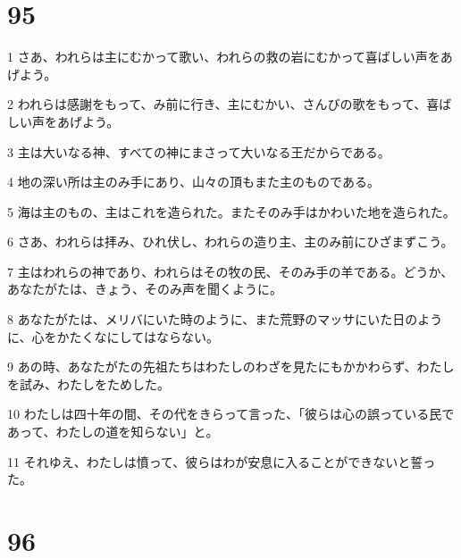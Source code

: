 \chapter{95}

\par 1 さあ、われらは主にむかって歌い、われらの救の岩にむかって喜ばしい声をあげよう。
\par 2 われらは感謝をもって、み前に行き、主にむかい、さんびの歌をもって、喜ばしい声をあげよう。
\par 3 主は大いなる神、すべての神にまさって大いなる王だからである。
\par 4 地の深い所は主のみ手にあり、山々の頂もまた主のものである。
\par 5 海は主のもの、主はこれを造られた。またそのみ手はかわいた地を造られた。
\par 6 さあ、われらは拝み、ひれ伏し、われらの造り主、主のみ前にひざまずこう。
\par 7 主はわれらの神であり、われらはその牧の民、そのみ手の羊である。どうか、あなたがたは、きょう、そのみ声を聞くように。
\par 8 あなたがたは、メリバにいた時のように、また荒野のマッサにいた日のように、心をかたくなにしてはならない。
\par 9 あの時、あなたがたの先祖たちはわたしのわざを見たにもかかわらず、わたしを試み、わたしをためした。
\par 10 わたしは四十年の間、その代をきらって言った、「彼らは心の誤っている民であって、わたしの道を知らない」と。
\par 11 それゆえ、わたしは憤って、彼らはわが安息に入ることができないと誓った。

\chapter{96}

